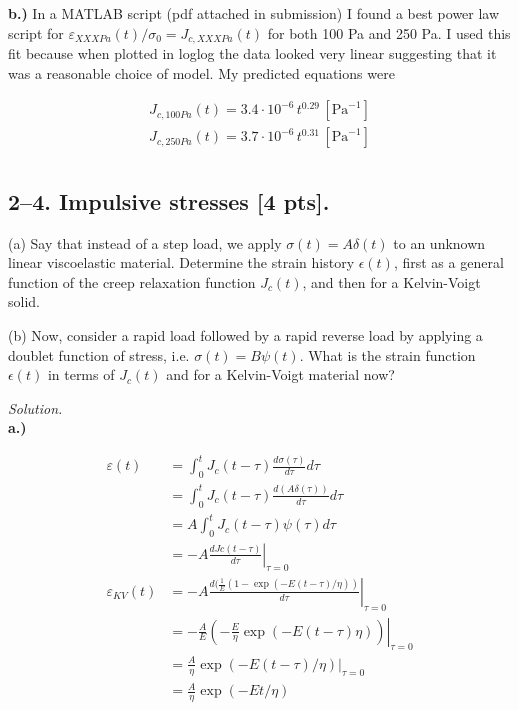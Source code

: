 \textbf{b.)} In a MATLAB script (pdf attached in submission) I found a best power law script for $\varepsilon_{XXXPa}(t)/\sigma_0 = J_{c,XXXPa}(t)$ for both 100 Pa and 250 Pa. I used this fit because when plotted in loglog the data looked very linear suggesting that it was a reasonable choice of model. My predicted equations were

\begin{align*}
J_{c,100Pa}(t) = 3.4 \cdot 10^{-6} \, t^{0.29} \,[\text{Pa}^{-1}] \\
J_{c,250Pa}(t) = 3.7 \cdot 10^{-6} \, t^{0.31} \,[\text{Pa}^{-1}] \\
\end{align*}

\bigskip
\subsection*{2--4. \textbf{Impulsive stresses} [4 pts].}

(a) Say that instead of a step load, we apply $\sigma(t) = A \delta(t)$ to an unknown linear viscoelastic material. 
Determine the strain history $\epsilon(t)$, first as a general function of the creep relaxation function $J_c(t)$, and then for a Kelvin-Voigt solid. 

(b) Now, consider a rapid load followed by a rapid reverse load by applying a doublet function of stress, i.e. $\sigma(t) = B \psi(t)$. 
What is the strain function $\epsilon(t)$ in terms of $J_c(t)$ and for a Kelvin-Voigt material now? 

\bigskip

\textit{Solution.}\\

\textbf{a.)} 

\begin{align*}
    \varepsilon(t) &= \int_0^t J_c(t-\tau)\frac{d\sigma(\tau)}{d\tau}d\tau \\
    &=  \int_0^t J_c(t-\tau)\frac{d(A\delta(\tau))}{d\tau}d\tau \\
    &=  A\int_0^t J_c(t-\tau)\psi(\tau) d\tau \\
    &= -A\left. \frac{dJc(t-\tau)}{d\tau} \right|_{\tau=0} \\
    \varepsilon_{KV}(t)&= -A\left. \frac{d(\frac{1}{E}(1-\exp(-E(t-\tau)/\eta))}{d\tau} \right|_{\tau=0} \\
    &= -\frac{A}{E} \left.\left( -\frac{E}{\eta}\exp(-E(t-\tau)\eta) \right)\right|_{\tau=0} \\
    &= \frac{A}{\eta}\left.\exp(-E(t-\tau)/\eta) \right|_{\tau=0} \\
    &= \frac{A}{\eta}\exp(-Et/\eta)
\end{align*}

